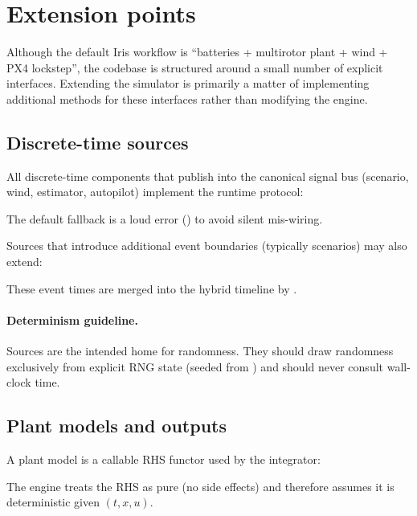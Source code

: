 \section{Extension points}
\label{sec:extension-points}

Although the default Iris workflow is ``batteries + multirotor plant + wind + PX4 lockstep'', the codebase is structured around a small number of explicit interfaces. Extending the simulator is primarily a matter of implementing additional methods for these interfaces rather than modifying the engine.

\subsection{Discrete-time sources}

All discrete-time components that publish into the canonical signal bus (scenario, wind, estimator, autopilot) implement the runtime protocol:
\begin{quote}\small
{}
\end{quote}
The default fallback is a loud error () to avoid silent mis-wiring.

Sources that introduce additional event boundaries (typically scenarios) may also extend:
\begin{quote}\small
{}
\end{quote}
These event times are merged into the hybrid timeline by .

\paragraph{Determinism guideline.}
Sources are the intended home for randomness. They should draw randomness exclusively from explicit RNG state (seeded from ) and should never consult wall-clock time.

\subsection{Plant models and outputs}

A plant model is a callable RHS functor used by the integrator:
\begin{quote}\small
{}
\end{quote}
The engine treats the RHS as pure (no side effects) and therefore assumes it is deterministic given \((t,x,u)\).

